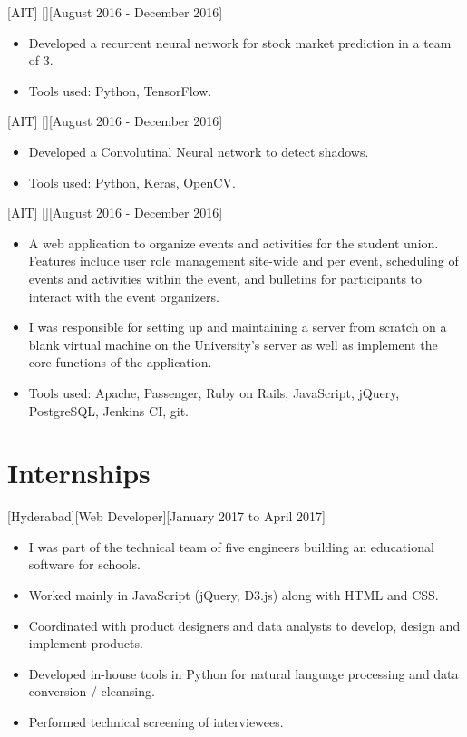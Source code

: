 \documentclass{article}
\begin{document}
[AIT]
[][August 2016 - December 2016]
\begin{itemize}
    \item Developed a recurrent neural network for stock market prediction in a team of 3.
    \item Tools used: Python, TensorFlow.
\end{itemize}

[AIT]
[][August 2016 - December 2016]
\begin{itemize}
    \item Developed a Convolutinal Neural network to detect shadows.
    \item Tools used: Python, Keras, OpenCV.
\end{itemize}

[AIT]
[][August 2016 - December 2016]
\begin{itemize}
    \item A web application to organize events and activities for the student union. Features include user role management site-wide and per event, scheduling of events and activities within the event, and bulletins for participants to interact with the event organizers.
    \item  I was responsible for setting up and maintaining a server from scratch on a blank virtual machine on the University's server as well as implement the core functions of the application.
    \item Tools used: Apache, Passenger, Ruby on Rails, JavaScript, jQuery, PostgreSQL, Jenkins CI, git.
\end{itemize}
 
\section{Internships}
[Hyderabad][Web Developer][January 2017 to April 2017]

\begin{itemize}
    \item I was part of the technical team of five engineers building an educational software for schools.
    \item Worked mainly in JavaScript (jQuery, D3.js) along with HTML and CSS.
    \item Coordinated with product designers and data analysts to develop, design and implement products.
    \item Developed in-house tools in Python for natural language processing and data conversion / cleansing.
    \item Performed technical screening of interviewees.
\end{itemize}
\end{document}
